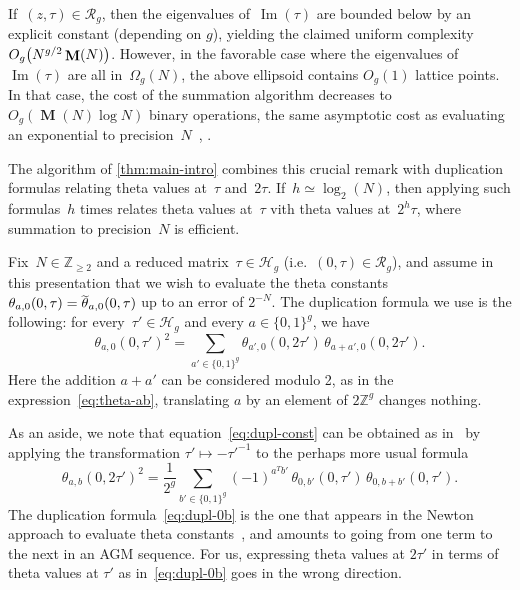 \documentclass[12pt,oneside]{amsart}
\numberwithin{equation}{section}
\theoremstyle{definition}
\newcommand{\Z}{\mathbb{Z}}
\newcommand{\red}{\mathcal{R}}
\newcommand{\Half}{\mathcal{H}}
\DeclareMathOperator{\im}{Im}
\DeclareMathOperator{\thetatilde}{\rlap{\raisebox{-0.1ex}{$\widetilde{\phantom{\,t}}$}}\theta}
\DeclareMathOperator{\Mul}{\mathbf{M}}
\DeclarePairedDelimiter{\paren}{(}{)}
\begin{document}
If~$(z,\tau)\in \red_g$, then the eigenvalues of~$\im(\tau)$ are bounded below
by an explicit constant (depending on $g$), yielding the claimed uniform
complexity $O_g\paren[\big]{N^{g/2}\Mul(N)}$. However, in the favorable case
where the eigenvalues of~$\im(\tau)$ are all in~$\Omega_g(N)$, the above
ellipsoid contains $O_g(1)$ lattice points. In that case, the cost of the
summation algorithm decreases to $O_g(\Mul(N)\log N)$ binary operations, the
same asymptotic cost as evaluating an exponential to
precision~$N$~\cite{borweinArithmeticgeometricMeanFast1984},
\cite[§3.5]{dupontMoyenneArithmeticogeometriqueSuites2006}.

The algorithm of \cref{thm:main-intro} combines this crucial remark with
duplication formulas relating theta values at~$\tau$
and~$2\tau$. If~$h\simeq\log_2(N)$, then applying such formulas~$h$ times
relates theta values at~$\tau$ vith theta values at~$2^h\tau$, where summation
to precision~$N$ is efficient.

Fix~$N\in \Z_{\geq 2}$ and a reduced matrix~$\tau\in \Half_g$
(i.e.~$(0,\tau)\in \red_g$), and assume in this presentation that we wish to
evaluate the theta constants $\theta_{a,0}(0,\tau) = \thetatilde_{a,0}(0,\tau)$
up to an error of $2^{-N}$. The duplication formula we use is the following:
for every~$\tau'\in \Half_g$ and every $a\in\{0,1\}^g$, we have
\begin{equation}
  \label{eq:dupl-const}
  \theta_{a,0}(0,\tau')^2 = \sum_{a'\in \{0,1\}^g} %
  \theta_{a',0}(0, 2\tau')\, \theta_{a+a',0}(0,2\tau').
\end{equation}
Here the addition $a + a'$ can be considered modulo 2, as in the
expression~\eqref{eq:theta-ab}, translating $a$ by an element of $2\Z^g$
changes nothing.

As an aside, we note that equation~\eqref{eq:dupl-const} can be obtained as
in~\cite[Prop.~5.6]{dupontMoyenneArithmeticogeometriqueSuites2006} by applying
the transformation $\tau' \mapsto -\tau'^{-1}$ \cite[Case III
p.\,195]{mumfordTataLecturesTheta1983} to the perhaps more usual formula
\begin{equation}
  \label{eq:dupl-0b}
  \theta_{a,b}(0,2\tau')^2 = \frac{1}{2^g}\sum_{b'\in \{0,1\}^g} (-1)^{a^T b'}
  \, \theta_{0,b'}(0,\tau') \, \theta_{0,b + b'}(0, \tau').
\end{equation}
The duplication formula~\eqref{eq:dupl-0b} is the one that appears in the
Newton approach to evaluate theta
constants~\cite{dupontMoyenneArithmeticogeometriqueSuites2006,
  labrandeComputingThetaFunctions2016}, and amounts to going from one term to
the next in an AGM sequence. For us, expressing theta values at $2\tau'$ in
terms of theta values at $\tau'$ as in~\eqref{eq:dupl-0b} goes in the wrong
direction.
\end{document}
